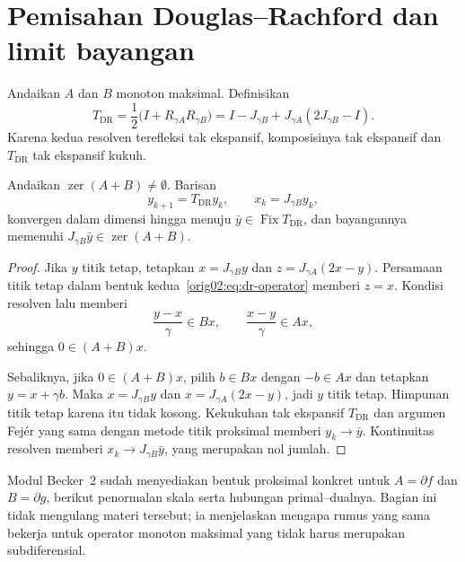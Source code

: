 \section{Pemisahan Douglas--Rachford dan limit bayangan}
\label{orig02:section:dr}

Andaikan $A$ dan $B$ monoton maksimal. Definisikan
\begin{equation}
  \label{orig02:eq:dr-operator}
  T_{\mathrm{DR}}
  =\frac12\bigl(I+R_{\gamma A}R_{\gamma B}\bigr)
  =I-J_{\gamma B}+J_{\gamma A}(2J_{\gamma B}-I).
\end{equation}
Karena kedua resolven terefleksi tak ekspansif, komposisinya tak ekspansif
dan $T_{\mathrm{DR}}$ tak ekspansif kukuh.

\begin{theorem}
  \label{orig02:theorem:dr-shadow}
  Andaikan $\operatorname{zer}(A+B)\neq\emptyset$. Barisan
  \begin{equation}
    \label{orig02:eq:dr-iteration}
    y_{k+1}=T_{\mathrm{DR}}y_k,
    \qquad x_k=J_{\gamma B}y_k,
  \end{equation}
  konvergen dalam dimensi hingga menuju $\bar y\in\operatorname{Fix}T_{\mathrm{DR}}$,
  dan bayangannya memenuhi
  $J_{\gamma B}\bar y\in\operatorname{zer}(A+B)$.
\end{theorem}
\begin{proof}
  Jika $y$ titik tetap, tetapkan
  $x=J_{\gamma B}y$ dan
  $z=J_{\gamma A}(2x-y)$. Persamaan titik tetap dalam
  bentuk kedua~\eqref{orig02:eq:dr-operator} memberi $z=x$. Kondisi resolven
  lalu memberi
  \begin{equation}
    \frac{y-x}{\gamma}\in Bx,
    \qquad
    \frac{x-y}{\gamma}\in Ax,
  \end{equation}
  sehingga $0\in(A+B)x$.

  Sebaliknya, jika $0\in(A+B)x$, pilih $b\in Bx$ dengan $-b\in Ax$ dan
  tetapkan $y=x+\gamma b$. Maka $x=J_{\gamma B}y$ dan
  $x=J_{\gamma A}(2x-y)$, jadi $y$ titik tetap. Himpunan titik tetap karena
  itu tidak kosong. Kekukuhan tak ekspansif $T_{\mathrm{DR}}$ dan argumen Fej\'er
  yang sama dengan metode titik proksimal memberi $y_k\to\bar y$. Kontinuitas
  resolven memberi $x_k\to J_{\gamma B}\bar y$, yang merupakan nol jumlah.
\end{proof}

Modul Becker~2 sudah menyediakan bentuk proksimal konkret untuk
$A=\partial f$ dan $B=\partial g$, berikut penormalan skala serta hubungan
primal--dualnya. Bagian ini tidak mengulang materi tersebut; ia menjelaskan
mengapa rumus yang sama bekerja untuk operator monoton maksimal yang tidak
harus merupakan subdiferensial.

